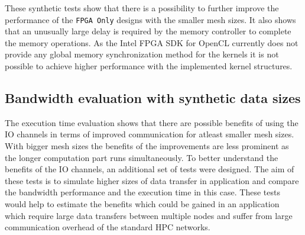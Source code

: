 These synthetic tests show that there is a possibility to further improve the performance of
the \texttt{FPGA Only} designs with the smaller mesh sizes. It also shows that an unusually
large delay is required by the memory controller to complete the memory operations. As the Intel FPGA SDK for OpenCL
currently does not provide any global memory synchronization method for the kernels it is not
possible to achieve higher performance with the implemented kernel structures.


\subsection{Bandwidth evaluation with synthetic data sizes}

The execution time evaluation shows that there are possible benefits of using the IO channels
in terms of improved communication for atleast smaller mesh sizes. With bigger mesh sizes
the benefits of the improvements are less prominent as the longer computation part runs
simultaneously. To better understand the benefits of the IO channels, an additional set of
tests were designed. The aim of these tests is to simulate higher sizes of data transfer
in application and compare the bandwidth performance and the execution time in this case.
These tests would help to estimate the benefits which could be gained in an application
which require large data transfers between multiple nodes and suffer from large
communication overhead of the standard HPC networks.

